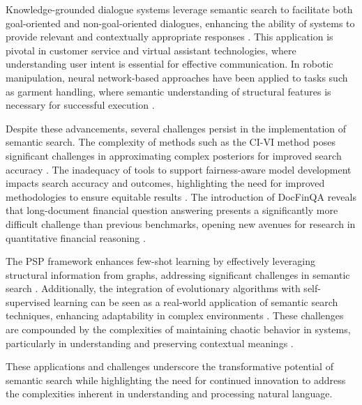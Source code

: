 Knowledge-grounded dialogue systems leverage semantic search to facilitate both goal-oriented and non-goal-oriented dialogues, enhancing the ability of systems to provide relevant and contextually appropriate responses \cite{chaudhuri2021groundingdialoguesystemsknowledge}. This application is pivotal in customer service and virtual assistant technologies, where understanding user intent is essential for effective communication. In robotic manipulation, neural network-based approaches have been applied to tasks such as garment handling, where semantic understanding of structural features is necessary for successful execution \cite{chen2023learninggraspclothingstructural}.



Despite these advancements, several challenges persist in the implementation of semantic search. The complexity of methods such as the CI-VI method poses significant challenges in approximating complex posteriors for improved search accuracy \cite{moens2021efficientsemiimplicitvariationalinference}. The inadequacy of tools to support fairness-aware model development impacts search accuracy and outcomes, highlighting the need for improved methodologies to ensure equitable results \cite{narayanan2023democratizecareneedfairness}. The introduction of DocFinQA reveals that long-document financial question answering presents a significantly more difficult challenge than previous benchmarks, opening new avenues for research in quantitative financial reasoning \cite{reddy2024docfinqalongcontextfinancialreasoning}.



The PSP framework enhances few-shot learning by effectively leveraging structural information from graphs, addressing significant challenges in semantic search \cite{ge2024psppretrainingstructureprompt}. Additionally, the integration of evolutionary algorithms with self-supervised learning can be seen as a real-world application of semantic search techniques, enhancing adaptability in complex environments \cite{le2019evolvingselfsupervisedneuralnetworks}. These challenges are compounded by the complexities of maintaining chaotic behavior in systems, particularly in understanding and preserving contextual meanings \cite{vashishtha2019restoringchaosusingdeep}.



These applications and challenges underscore the transformative potential of semantic search while highlighting the need for continued innovation to address the complexities inherent in understanding and processing natural language.





